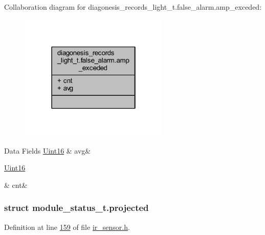 Collaboration diagram for diagonesis\+\_\+records\+\_\+light\+\_\+t.\+false\+\_\+alarm.\+amp\+\_\+exceded\+:\nopagebreak
\begin{figure}[H]
\begin{center}
\leavevmode
\includegraphics[width=202pt]{d7/d16/a00930}
\end{center}
\end{figure}
\begin{DoxyFields}{Data Fields}
\hypertarget{a00017_ae322d423f075b0ab2daad27011d24909}{\hyperlink{a00072_a59a9f6be4562c327cbfb4f7e8e18f08b}{Uint16}}\label{a00017_ae322d423f075b0ab2daad27011d24909}
&
avg&
\\
\hline

\hypertarget{a00017_a2817f701d5e1a1181e657251363295fd}{\hyperlink{a00072_a59a9f6be4562c327cbfb4f7e8e18f08b}{Uint16}}\label{a00017_a2817f701d5e1a1181e657251363295fd}
&
cnt&
\\
\hline

\end{DoxyFields}
\label{d6/d75/a00604}
\hypertarget{a00017_d6/d75/a00604}{}
\subsubsection{struct module\+\_\+status\+\_\+t.\+projected}


Definition at line \hyperlink{a00017_source_l00159}{159} of file \hyperlink{a00017_source}{ir\+\_\+sensor.\+h}.



